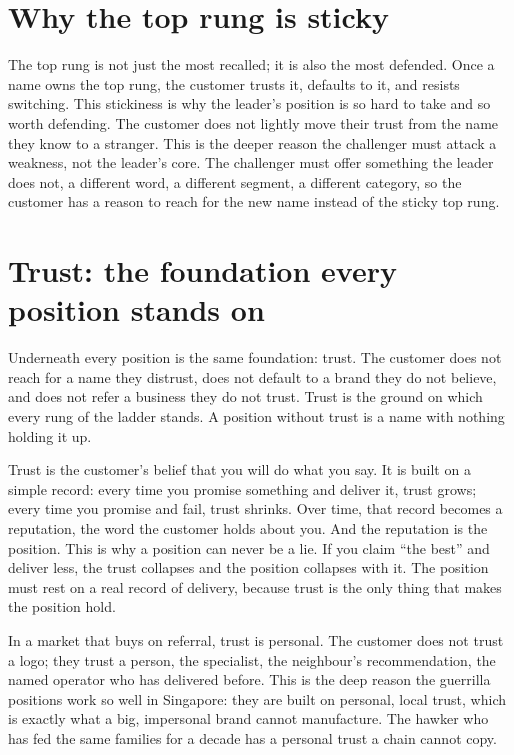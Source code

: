 \documentclass[10pt,twoside,openany]{memoir}
\newcommand{\needspacehead}{\needspace{4\baselineskip}}
\let\oldsection\section
\renewcommand{\section}{\needspacehead\oldsection}
\begin{document}
\section{Why the top rung is sticky}\label{why-the-top-rung-is-sticky}

The top rung is not just the most recalled; it is also the most
defended. Once a name owns the top rung, the customer trusts it,
defaults to it, and resists switching. This stickiness is why the
leader's position is so hard to take and so worth defending. The
customer does not lightly move their trust from the name they know to a
stranger. This is the deeper reason the challenger must attack a
weakness, not the leader's core. The challenger must offer something the
leader does not, a different word, a different segment, a different
category, so the customer has a reason to reach for the new name instead
of the sticky top rung.

\section{Trust: the foundation every position stands
on}\label{trust-the-foundation-every-position-stands-on}

Underneath every position is the same foundation: trust. The customer
does not reach for a name they distrust, does not default to a brand
they do not believe, and does not refer a business they do not trust.
Trust is the ground on which every rung of the ladder stands. A position
without trust is a name with nothing holding it up.

Trust is the customer's belief that you will do what you say. It is
built on a simple record: every time you promise something and deliver
it, trust grows; every time you promise and fail, trust shrinks. Over
time, that record becomes a reputation, the word the customer holds
about you. And the reputation is the position. This is why a position
can never be a lie. If you claim ``the best'' and deliver less, the
trust collapses and the position collapses with it. The position must
rest on a real record of delivery, because trust is the only thing that
makes the position hold.

In a market that buys on referral, trust is personal. The customer does
not trust a logo; they trust a person, the specialist, the neighbour's
recommendation, the named operator who has delivered before. This is the
deep reason the guerrilla positions work so well in Singapore: they are
built on personal, local trust, which is exactly what a big, impersonal
brand cannot manufacture. The hawker who has fed the same families for a
decade has a personal trust a chain cannot copy.
\end{document}
